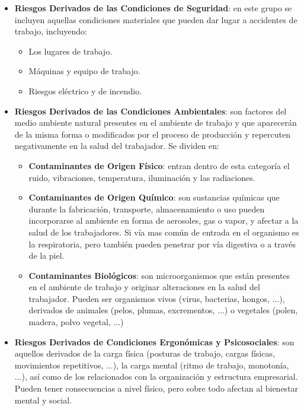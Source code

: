 \begin{itemize}
    \item \textbf{Riesgos Derivados de las Condiciones de Seguridad}: en este grupo se incluyen aquellas condiciones materiales que pueden dar lugar a accidentes de trabajo, incluyendo:
    \begin{itemize}
        \item Los lugares de trabajo.
        \item Máquinas y equipo de trabajo.
        \item Riesgos eléctrico y de incendio.
    \end{itemize}

    \item \textbf{Riesgos Derivados de las Condiciones Ambientales}: son factores del medio ambiente natural presentes en el ambiente de trabajo y que aparecerán de la misma forma o modificados por el proceso de producción y repercuten negativamente en la salud del trabajador. Se dividen en:
    \begin{itemize}
        \item \textbf{Contaminantes de Origen Físico}: entran dentro de esta categoría el ruido, vibraciones, temperatura, iluminación y las radiaciones.
        \item \textbf{Contaminantes de Origen Químico}: son sustancias químicas que durante la fabricación, transporte, almacenamiento o uso pueden incorporarse al ambiente en forma de aerosoles, gas o vapor, y afectar a la salud de los trabajadores. Si vía mas común de entrada en el organismo es la respiratoria, pero también pueden penetrar por vía digestiva o a través de la piel.
        \item \textbf{Contaminantes Biológicos}: son microorganismos que están presentes en el ambiente de trabajo y originar alteraciones en la salud del trabajador. Pueden ser organismos vivos (virus, bacterias, hongos, ...), derivados de animales (pelos, plumas, excrementos, ...) o vegetales (polen, madera, polvo vegetal, ...)
    \end{itemize}

    \item \textbf{Riesgos Derivados de Condiciones Ergonómicas y Psicosociales}: son aquellos derivados de la carga física (posturas de trabajo, cargas físicas, movimientos repetitivos, ...), la carga mental (ritmo de trabajo, monotonía, ...), así como de los relacionados con la organización y estructura empresarial. Pueden tener consecuencias a nivel físico, pero sobre todo afectan al bienestar mental y social.
\end{itemize}

